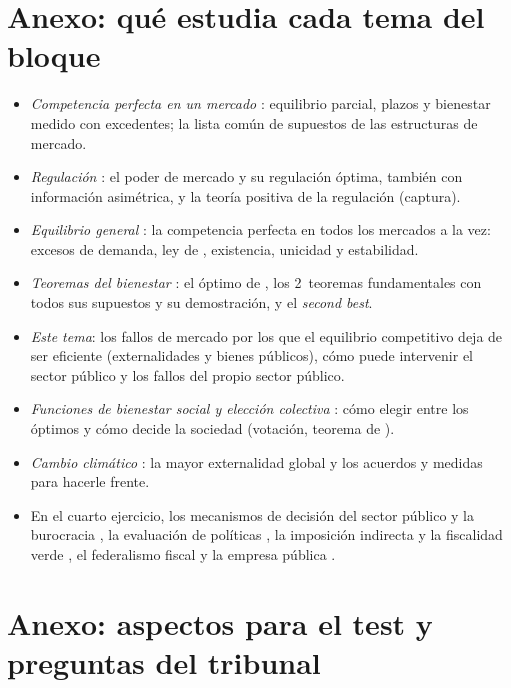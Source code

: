 \documentclass[11pt]{article}
\begin{document}
\section{Anexo: qué estudia cada tema del bloque}\label{anexo:bloque}

\begin{itemize}
\item \emph{Competencia perfecta en un mercado} : equilibrio parcial, plazos y bienestar medido con excedentes; la lista común de supuestos de las estructuras de mercado.
\item \emph{Regulación} : el poder de mercado y su regulación óptima, también con información asimétrica, y la teoría positiva de la regulación (captura).
\item \emph{Equilibrio general} : la competencia perfecta en todos los mercados a la vez: excesos de demanda, ley de , existencia, unicidad y estabilidad.
\item \emph{Teoremas del bienestar} : el óptimo de , los 2~teoremas fundamentales con todos sus supuestos y su demostración, y el \emph{second best}.
\item \emph{Este tema}: los fallos de mercado por los que el equilibrio competitivo deja de ser eficiente (externalidades y bienes públicos), cómo puede intervenir el sector público y los fallos del propio sector público.
\item \emph{Funciones de bienestar social y elección colectiva} : cómo elegir entre los óptimos y cómo decide la sociedad (votación, teorema de ).
\item \emph{Cambio climático} : la mayor externalidad global y los acuerdos y medidas para hacerle frente.
\item En el cuarto ejercicio, los mecanismos de decisión del sector público y la burocracia , la evaluación de políticas , la imposición indirecta y la fiscalidad verde , el federalismo fiscal  y la empresa pública .
\end{itemize}

\section{Anexo: aspectos para el test y preguntas del tribunal}\label{anexo:test}
\end{document}
